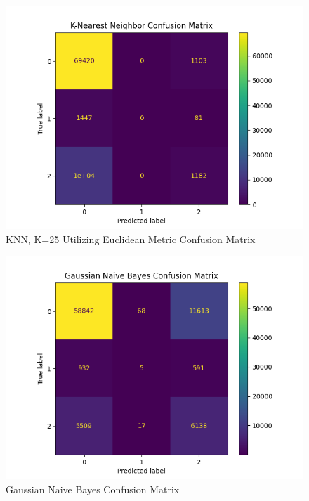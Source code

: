 \documentclass[journal]{IEEEtran}
\begin{document}
\begin{figure}[h!]
    \includegraphics[scale=0.5]{K-Nearest Neighbor_cm.png}
    \centering
    \caption{KNN, K=25 Utilizing Euclidean Metric Confusion Matrix}
    \label{fig:knn}
    \end{figure}

\pagebreak

\begin{figure}[h!]
    \includegraphics[scale=0.5]{Gaussian Naive Bayes_cm.png}
    \centering
    \caption{Gaussian Naive Bayes Confusion Matrix}
    \label{fig:gaussnb}
    \end{figure}
\end{document}
